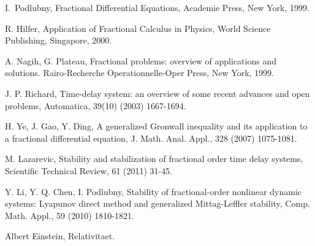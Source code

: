 \begin{thebibliography}{9}

 I.~Podlubny, Fractional Differential Equations, Academie Press, New York, 1999.

 R. Hilfer, Application of Fractional Calculus in Physics, World Science Publishing, Singapore, 2000.

 A. Nagih, G. Plateau, Fractional problems: overview of applications and solutions. Rairo-Recherche Operationnelle-Oper Press, New York, 1999.

 J. P. Richard, Time-delay system: an overview of some recent advances and open problems, Automatica, 39(10) (2003) 1667-1694.

 H. Ye, J. Gao, Y. Ding, A generalized Gronwall inequality and its application to a fractional differential equation, J. Math. Anal. Appl., 328 (2007) 1075-1081.

 M. Lazarevic, Stability and stabilization of fractional order time delay systems, Scientific Technical Review, 61 (2011) 31-45.

 Y. Li, Y. Q. Chen, I. Podlubny, Stability of fractional-order nonlinear dynamic systems: Lyapunov direct method and generalized Mittag-Leffler stability, Comp. Math. Appl., 59 (2010) 1810-1821.

 Albert Einstein, Relativitaet.


\end{thebibliography}

